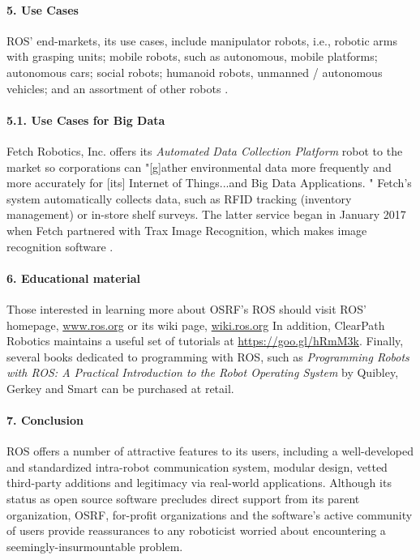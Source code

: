 \documentclass[9pt,twocolumn,twoside]{../../styles/osajnl}
\begin{document}
\paragraph{5. Use Cases}
ROS' end-markets, its use cases, include manipulator robots, i.e., robotic arms with grasping units; mobile robots, such as autonomous, mobile platforms; autonomous cars; social robots; humanoid robots, unmanned / autonomous vehicles; and an assortment of other robots \cite{www-ros-ecosystem}.


\paragraph{5.1. Use Cases for Big Data}

Fetch Robotics, Inc. offers its \textit{Automated Data Collection Platform} robot to the market so corporations can "[g]ather environmental data more frequently and more accurately for [its] Internet of Things...and Big Data Applications. \cite{www-ros-fetch}" Fetch's system automatically collects data, such as RFID tracking (inventory management) or in-store shelf surveys. The latter service began in January 2017 when Fetch partnered with Trax Image Recognition, which makes image recognition software \cite{www-ros-trax}.  

\paragraph{6. Educational material}

Those interested in learning more about OSRF's ROS should visit ROS' homepage, \url{www.ros.org} or its wiki page, \url{wiki.ros.org}  In addition, ClearPath Robotics maintains a useful set of tutorials at \url{https://goo.gl/hRmM3k}.  Finally, several books dedicated to programming with ROS, such as \textit{Programming Robots with ROS: A Practical Introduction to the Robot Operating System} by Quibley, Gerkey and Smart can be purchased at retail.
\paragraph{7. Conclusion}

ROS offers a number of attractive features to its users, including a well-developed and standardized intra-robot communication system, modular design, vetted third-party additions and legitimacy via real-world applications.  Although its status as open source software precludes direct support from its parent organization, OSRF, for-profit organizations and the software's active community of users provide reassurances to any roboticist worried about encountering a seemingly-insurmountable problem.   
\end{document}
